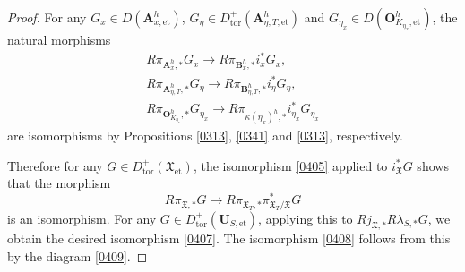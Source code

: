 \documentclass{amsart}
\theoremstyle{remark}
\numberwithin{equation}{subsection}
\newcommand{\et}{\mathrm{et}}
\newcommand{\tor}{\mathrm{tor}}
\newcommand{\alg}[1]{\mathbf{#1}}
\newcommand{\algfrak}[1]{\bm{\mathfrak{#1}}}
\begin{document}
\begin{proof}
	For any $G_{x} \in D(\alg{A}_{x, \et}^{h})$,
	$G_{\eta} \in D_{\tor}^{+}(\alg{A}_{\eta, T, \et}^{h})$ and
	$G_{\eta_{x}} \in D(\alg{O}_{K_{\eta_{x}}, \et}^{h})$,
	the natural morphisms
		\begin{gather*}
					R \pi_{\alg{A}_{x}^{h}, \ast} G_{x}
				\to
					R \pi_{\alg{B}_{x}^{h}, \ast} i_{x}^{\ast} G_{x},
			\\
					R \pi_{\alg{A}_{\eta, T}^{h}, \ast} G_{\eta}
				\to
					R \pi_{\alg{B}_{\eta, T}^{h}, \ast} i_{\eta}^{\ast} G_{\eta},
			\\
					R \pi_{\alg{O}_{K_{\eta_{x}}}^{h}, \ast} G_{\eta_{x}}
				\to
					R \pi_{\algfrak{\kappa}(\eta_{x})^{h}, \ast} i_{\eta_{x}}^{\ast} G_{\eta_{x}}
		\end{gather*}
	are isomorphisms by Propositions \ref{0313}, \ref{0341} and \ref{0313}, respectively.
	
	Therefore for any $G \in D_{\tor}^{+}(\algfrak{X}_{\et})$,
	the isomorphism \eqref{0405} applied to $i_{\algfrak{X}}^{\ast} G$
	shows that the morphism
		\[
				R \pi_{\algfrak{X}, \ast} G
			\to
				R \pi_{\algfrak{X}_{T}, \ast} \pi_{\algfrak{X}_{T} / \algfrak{X}}^{\ast} G
		\]
	is an isomorphism.
	For any $G \in D_{\tor}^{+}(\alg{U}_{S, \et})$,
	applying this to $R j_{\mathfrak{X}, \ast} R \lambda_{S, \ast} G$,
	we obtain the desired isomorphism \eqref{0407}.
	The isomorphism \eqref{0408} follows from this by the diagram \eqref{0409}.
\end{proof}
\end{document}
